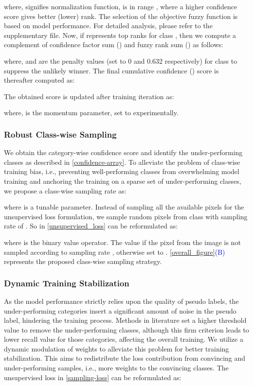 \documentclass[runningheads]{llncs}
\begin{document}
where,  signifies normalization function,  is in range , where a higher confidence score gives better (lower) rank. The selection of the objective fuzzy function is based on model performance. For detailed analysis, please refer to the supplementary file. Now, if  represents top  ranks for class , then we compute a complement of confidence factor sum () and fuzzy rank sum () as follows:

where,  and  are the penalty values (set to 0 and 0.632 respectively) for class  to suppress the unlikely winner. The final cumulative confidence () score is thereafter computed as:

The obtained  score is updated after  training iteration as:

where,  is the momentum parameter, set to  experimentally. 


\subsubsection{Robust Class-wise Sampling}
We obtain the category-wise confidence score and identify the under-performing classes as described in \autoref{confidence-array}. To alleviate the problem of class-wise training bias, i.e., preventing well-performing classes from overwhelming model training and anchoring the training on a sparse set of under-performing classes, we propose a class-wise sampling rate  as:

where  is a tunable parameter. Instead of sampling all the available pixels for the unsupervised loss formulation, we sample random pixels from class  with sampling rate of . So  in \autoref{unsupervised_loss} can be reformulated as:

where  is the binary value operator. The value  if the  pixel from the  image is not sampled according to sampling rate , otherwise set to . \autoref{overall_figure}\textcolor{blue}{(B)} represents the proposed class-wise sampling strategy. 


\subsubsection{Dynamic Training Stabilization}
As the model performance strictly relies upon the quality of pseudo labels, the under-performing categories insert a significant amount of noise in the pseudo label, hindering the training process. Methods in literature \cite{ke2020guided} set a higher threshold value to remove the under-performing classes, although this firm criterion leads to lower recall value for those categories, affecting the overall training. We utilize a dynamic modulation of weights to alleviate this problem for better training stabilization. This aims to redistribute the loss contribution from convincing and under-performing samples, i.e., more weights to the convincing classes. The unsupervised loss in \autoref{sampling-loss} can be reformulated as:
\end{document}
